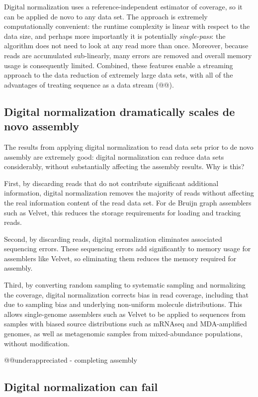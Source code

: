 \documentclass[10pt,draft]{article}
\begin{document}
Digital normalization uses a reference-independent estimator of
coverage, so it can be applied de novo to any data set.  The approach
is extremely computationally convenient: the runtime complexity is
linear with respect to the data size, and perhaps more importantly it
is potentially {\em single-pass}: the algorithm does not need to look
at any read more than once.  Moreover, because reads are accumulated
sub-linearly, many errors are removed and overall memory usage is
consequently limited.  Combined, these features enable a streaming
approach to the data reduction of extremely large data sets, with all
of the advantages of treating sequence as a data stream (@@).

\subsection*{Digital normalization dramatically scales de novo assembly}

The results from applying digital normalization to read data sets
prior to de novo assembly are extremely good: digital normalization
can reduce data sets considerably, without substantially affecting the
assembly results.  Why is this?

First, by discarding reads that do not contribute significant
additional information, digital normalization removes the majority of
reads without affecting the real information content of the read data
set.  For de Bruijn graph assemblers such as Velvet, this reduces the
storage requirements for loading and tracking reads.

Second, by discarding reads, digital normalization eliminates
associated sequencing errors.  These sequencing errors add
significantly to memory usage for assemblers like Velvet, so
eliminating them reduces the memory required for assembly.

Third, by converting random sampling to systematic sampling and
normalizing the coverage, digital normalization corrects bias in read
coverage, including that due to sampling bias and underlying
non-uniform molecule distributions.  This allows single-genome
assemblers such as Velvet to be applied to sequences from samples with
biased source distributions such as mRNAseq and MDA-amplified genomes,
as well as metagenomic samples from mixed-abundance populations,
without modification.

@@underappreciated - completing assembly

\subsection*{Digital normalization can fail}
\end{document}
